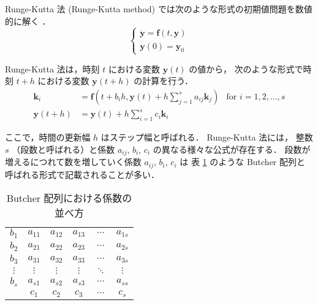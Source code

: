 %

Runge-Kutta 法 (Runge-Kutta method) では次のような形式の初期値問題を数値的に解く
\cite{Mitsui1993}．
\begin{equation}
    \begin{cases}
        \dot{\bm{y}} = \bm{f}(t, \bm{y}) \\
        \bm{y}(0) = \bm{y}_0
    \end{cases}
\end{equation}

Runge-Kutta 法は，時刻 $t$ における変数 $\bm{y}(t)$ の値から，
次のような形式で時刻 $t + h$ における変数 $\bm{y}(t + h)$ の計算を行う．
\begin{align}
    \bm{k}_i      & = \bm{f}\left(t + b_i h, \bm{y}(t) + h \sum_{j = 1}^s a_{ij} \bm{k}_j \right)
                  & \text{for $i = 1, 2, \ldots, s$}
    \label{eq:ode_runge-kutta_k-law}                                                              \\
    \bm{y}(t + h) & = \bm{y}(t) + h \sum_{i=1}^s c_i \bm{k}_i
    \label{eq:ode_runge-kutta_y-law}
\end{align}

ここで，時間の更新幅 $h$ はステップ幅と呼ばれる．
Runge-Kutta 法には，
整数 $s$ （段数と呼ばれる）と係数 $a_{ij}$, $b_i$, $c_i$ の異なる様々な公式が存在する．
段数が増えるにつれて数を増していく係数 $a_{ij}$, $b_i$, $c_i$ は
表 \ref{table:ode_runge-kutta_butcher-array-general} のような
Butcher 配列と呼ばれる形式で記載されることが多い．

\begin{table}[bp]
    \caption{Butcher 配列における係数の並べ方}
    \label{table:ode_runge-kutta_butcher-array-general}
    \centering
    \begin{tabular}{c|ccccc}
        $b_1$    & $a_{11}$ & $a_{12}$ & $a_{13}$ & $\cdots$ & $a_{1s}$ \\
        $b_2$    & $a_{21}$ & $a_{22}$ & $a_{23}$ & $\cdots$ & $a_{2s}$ \\
        $b_3$    & $a_{31}$ & $a_{32}$ & $a_{33}$ & $\cdots$ & $a_{3s}$ \\
        $\vdots$ & $\vdots$ & $\vdots$ & $\vdots$ & $\ddots$ & $\vdots$ \\
        $b_s$    & $a_{s1}$ & $a_{s2}$ & $a_{s3}$ & $\cdots$ & $a_{ss}$ \\
        \hline
                 & $c_1$    & $c_2$    & $c_3$    & $\cdots$ & $c_s$
    \end{tabular}
\end{table}

